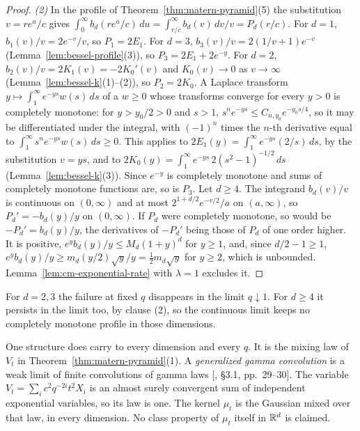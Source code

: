 \begin{proof}
\emph{(2)} In the profile of Theorem~\ref{thm:matern-pyramid}(5) the substitution $v = re^u/c$
gives $\int_0^\infty b_d(re^u/c)\,du = \int_{r/c}^\infty b_d(v)\,dv/v = P_d(r/c)$. For $d = 1$,
$b_1(v)/v = 2e^{-v}/v$, so $P_1 = 2E_1$. For $d = 3$, $b_3(v)/v = 2(1/v + 1)e^{-v}$
(Lemma~\ref{lem:bessel-profile}(3)), so $P_3 = 2E_1 + 2e^{-y}$. For $d = 2$,
$b_2(v)/v = 2K_1(v) = -2K_0'(v)$ and $K_0(v) \to 0$ as $v \to \infty$
(Lemma~\ref{lem:bessel-k}(1)--(2)), so $P_2 = 2K_0$. A Laplace transform
$y \mapsto \int_1^\infty e^{-ys}w(s)\,ds$ of a $w \ge 0$ whose transforms converge for every $y > 0$ is
completely monotone: for $y > y_0/2 > 0$ and $s > 1$, $s^ne^{-ys} \le C_{n,y_0}e^{-y_0s/4}$, so it may be
differentiated under the integral, with $(-1)^n$ times the $n$-th derivative equal to
$\int_1^\infty s^ne^{-ys}w(s)\,ds \ge 0$. This applies to $2E_1(y) = \int_1^\infty e^{-ys}(2/s)\,ds$, by
the substitution $v = ys$, and to $2K_0(y) = \int_1^\infty e^{-ys}\,2(s^2 - 1)^{-1/2}\,ds$
(Lemma~\ref{lem:bessel-k}(3)). Since $e^{-y}$ is completely monotone and sums of completely monotone
functions are, so is $P_3$. Let $d \ge 4$. The integrand $b_d(v)/v$ is continuous on $(0, \infty)$
and at most $2^{1+d/2}e^{-v/2}/a$ on $(a, \infty)$, so $P_d' = -b_d(y)/y$ on $(0, \infty)$. If $P_d$
were completely monotone, so would be $-P_d' = b_d(y)/y$, the derivatives of $-P_d'$ being those of
$P_d$ of one order higher. It is positive, $e^yb_d(y)/y \le M_d(1 + y)^d$ for $y \ge 1$, and, since
$d/2 - 1 \ge 1$, $e^yb_d(y)/y \ge m_d(y/2)\sqrt y/y = \tfrac12m_d\sqrt y$ for $y \ge 2$, which is
unbounded. Lemma~\ref{lem:cm-exponential-rate} with $\lambda = 1$ excludes it.
\end{proof}

For $d = 2, 3$ the failure at fixed $q$ disappears in the limit $q \downarrow 1$. For $d \ge 4$ it
persists in the limit too, by clause (2), so the continuous limit keeps no completely monotone
profile in those dimensions.

One structure does carry to every dimension and every $q$. It is the mixing law of $V_t$ in
Theorem~\ref{thm:matern-pyramid}(1). A \emph{generalized gamma convolution} is a weak limit of
finite convolutions of gamma laws [, \S 3.1, pp.~29--30]. The variable
$V_t = \sum_ic^2q^{-2i}t^2X_i$ is an almost surely convergent sum of independent exponential
variables, so its law is one. The kernel $\mu_t$ is the Gaussian mixed over that law, in every
dimension. No class property of $\mu_t$ itself in $\mathbb{R}^d$ is claimed.

